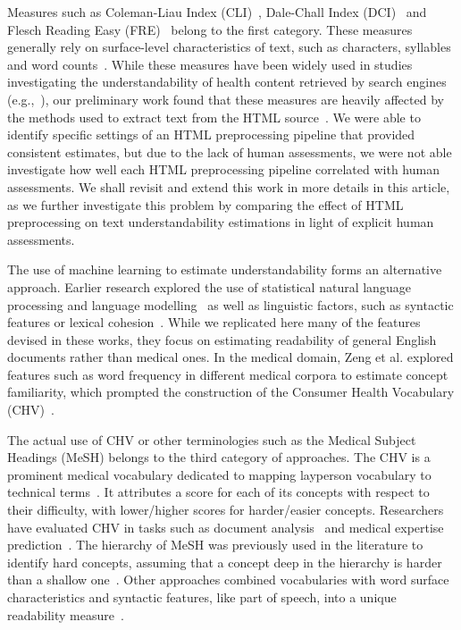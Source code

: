 Measures such as Coleman-Liau Index (CLI)~\cite{cli75}, Dale-Chall Index (DCI)~\cite{dale48} and Flesch Reading Easy (FRE)~\cite{flesch75}
belong to the first category. These measures generally rely on surface-level characteristics of text, such as characters, syllables and word counts~\cite{dubay04}. While these measures have been widely used in studies investigating the understandability of health content retrieved by search engines (e.g.,~\cite{becker04,graber99,fitzsimmons10,stossel12,wiener13,patel13,meillier17}), 
our preliminary work found that these measures are heavily affected by the methods used to extract text from the HTML source~\cite{palotti15}. We were able to identify specific settings of an HTML preprocessing pipeline that provided consistent estimates, but due to the lack of human assessments, we were not able investigate how well each HTML preprocessing pipeline correlated with human assessments.
We shall revisit and extend this work in more details in this article, as we further investigate this problem by comparing the effect of HTML preprocessing on text understandability estimations in light of explicit human assessments. 

The use of machine learning to estimate understandability forms an alternative approach. Earlier research explored the use of statistical natural language processing and language modelling~\cite{liu04,collins05,heilman07} as well as linguistic factors, such as syntactic features or lexical cohesion~\cite{pitler08}. While we replicated here many of the features devised in these works, they focus on estimating readability of general English documents rather than medical ones. In the medical domain, Zeng et al. explored features such as word frequency in different medical corpora to estimate concept familiarity, which prompted the construction of the Consumer Health Vocabulary (CHV)~\cite{zeng05,zeng06,zeng08}.  

The actual use of CHV or other terminologies such as the Medical Subject Headings (MeSH) belongs to the third category of approaches. The CHV is a prominent medical vocabulary dedicated to mapping layperson vocabulary to technical terms~\cite{zeng06}. It attributes a score for each of its concepts with respect to their difficulty, with lower/higher scores for harder/easier concepts. Researchers have evaluated CHV in tasks such as document analysis~\cite{leroy08} and medical expertise prediction~\cite{palotti14}.
The hierarchy of MeSH was previously used in the literature to identify hard concepts, assuming that a concept deep in the hierarchy is harder than a shallow one~\cite{yan11}. Other approaches combined vocabularies with word surface characteristics and syntactic features, like part of speech, into a unique readability measure~\cite{kim2007beyond}.

